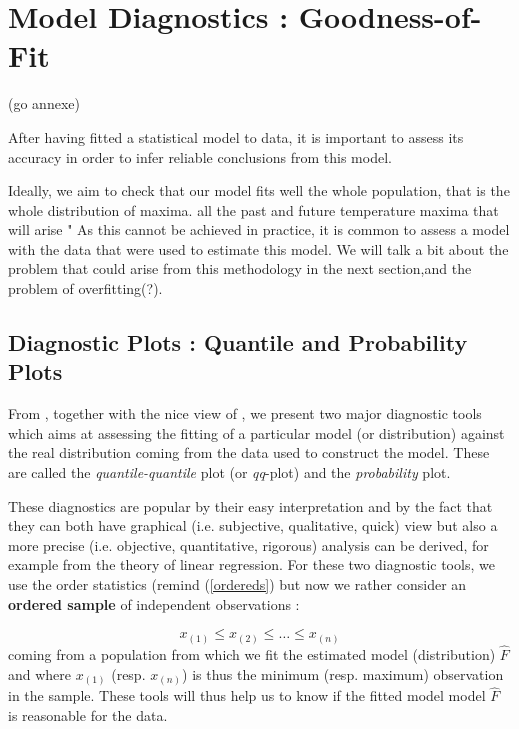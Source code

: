 \documentclass[11pt,a4paper,openany ]{book}
\begin{document}
\section{Model Diagnostics : Goodness-of-Fit} (go annexe)

After having fitted a statistical model to data, it is important to assess its accuracy in order to infer reliable conclusions from this model.

Ideally, we aim to check that our model fits well the whole population, that is the whole distribution of maxima. all the past and future temperature maxima that will arise " As this cannot be achieved in practice, it is common to assess a model with the data that were used to estimate this model. We will talk a bit about the problem that could arise from this methodology in the next section,and the problem of overfitting(?).



\subsection{Diagnostic Plots : Quantile and Probability Plots}
From \citet[pp.18-36]{beirlant_practical_1996}, together with the nice view of \citet[pp.36-37]{coles_introduction_2001}, we present two major diagnostic tools which aims at assessing the fitting of a particular model (or distribution) against the real distribution coming from the data used to construct the model.
These are called the \emph{quantile-quantile} plot (or \emph{qq}-plot) and the \emph{probability} plot. 

These diagnostics are popular by their easy interpretation and by the fact that they can both have graphical (i.e. subjective, qualitative, quick) view but also a more precise (i.e. objective, quantitative, rigorous) analysis can be derived, for example from the theory of linear regression. 
\newline
For these two diagnostic tools, we use the order statistics (remind (\ref{ordereds}) but now we rather consider an \textbf{ordered sample} of independent observations :

\begin{equation} \label{ordersamp}
x_{(1)}\leq x_{(2)}\leq\dots\leq x_{(n)}
\end{equation}
coming from a population from which we fit the estimated model (distribution) $\hat{F}$ and where $x_{(1)}$ (resp. $x_{(n)}$) is thus the minimum (resp. maximum) observation in the sample. These tools will thus help us to know if the fitted model model $\hat{F}$ is reasonable for the data.
\end{document}
